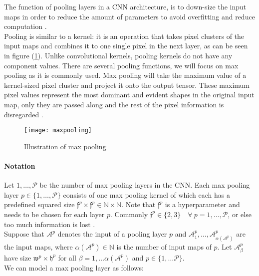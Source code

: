 \documentclass{article}
\begin{document}
The function of pooling layers in a CNN architecture, is to down-size the input maps in order to reduce the amount of parameters to avoid overfitting and reduce computation \cite{Goodfellow-et-al-2016}.\\
Pooling is similar to a kernel: it is an operation that takes pixel clusters of the input maps and combines it to one single pixel in the next layer, as can be seen in figure (\ref{max_pooling_pic}). Unlike convolutional kernels, pooling kernels do not have any component values.
There are several pooling functions, we will focus on max pooling as it is commonly used. Max pooling will take the maximum value of a kernel-sized pixel cluster and project it onto the output tensor. These maximum pixel values represent the most dominant and evident shapes in the original input map, only they are passed along and the rest of the pixel information is disregarded \cite{cs231:optimizers}.

\begin{figure}[!htb]
\vskip 0.2in
\begin{center}
\centerline{\texttt{[image: maxpooling]}}
\caption{Illustration of max pooling \cite{maxpool}\label{max_pooling_pic}}
\end{center}
\vskip -0.2in
\end{figure}

\paragraph{Notation}

Let $1,\ldots, \mathcal{P}$ be the number of max pooling layers in the CNN. Each max pooling layer $p \in \{1,\ldots, \mathcal{P} \}$ consists of one max pooling kernel of which each has a predefined squared size $\mathfrak{f}^p \times \mathfrak{f}^p \in \mathbb{N}\times \mathbb{N}$. Note that $\mathfrak{f}^p$ is a hyperparameter and needs to be chosen for each layer $p$. Commonly $\mathfrak{f}^p \in \{2,3\} \quad \forall \ p=1, \ldots, \mathcal{P}$, or else too much information is lost \cite{cs231:optimizers}.\\
Suppose that $\mathcal{A}^p$ denotes the input of a pooling layer $p$ and $\mathcal{A}^p_1, \ldots, \mathcal{A}^p_{\alpha(\mathcal{A}^p)}$ are the input maps, where $\alpha(\mathcal{A}^p) \in \mathbb{N}$ is the number of input maps of $p$. Let $\mathcal{A}_\beta^p$ have size $\mathfrak{w}^p \times \mathfrak{h}^p$ for all $\beta=1, \ldots \alpha(\mathcal{A}^p)$ and $p \in \{1, \ldots \mathcal{P} \}$.\\
We can model a max pooling layer as follows:
\end{document}

